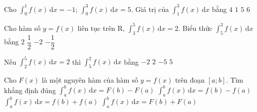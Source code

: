 \begin{ex}%
	Cho $\displaystyle\int_0^1f(x)\mathrm{\,d}x=-1$; $\displaystyle\int_0^3f(x)\mathrm{\,d}x=5$. Giá trị của $\displaystyle\int_1^3f(x)\mathrm{\,d}x$ bằng 
	\choice 
		{$4$} 
		{$1$} 
		 {$5$}
		{\True $6$} 
\end{ex}

\begin{ex}%
	Cho hàm số $y=f(x)$ liên tục trên $\mathrm{R}$, $\displaystyle\int_3^5 f(x)\mathrm{\,d}x =2$. Biểu thức  $\displaystyle\int_5^3 f(x)\mathrm{\,d}x$ bằng
	\choice 
		{$2$} 
		 {$\dfrac{1}{2}$}
		 {\True $-2$}
		{$-\dfrac{1}{2}$} 
\end{ex}

\begin{ex}%
	 Nếu $\displaystyle\int_2^5f(x)\mathrm{\,d}x=2$ thì $\displaystyle\int_5^2f(x)\mathrm{\,d}x$ bằng
	 \choice
		{\True  $-2$}
		{$2$} 
		{$-5$} 
		{$5$} 
\end{ex}

\begin{ex}%
	Cho $F(x)$ là một nguyên hàm của hàm số $y=f(x)$ trên  đoạn $[a; b]$. Tìm khẳng định đúng
	 \choice
		{\True $\displaystyle\int_a^b f(x)\mathrm{\,d}x=F(b)-F(a)$} 
		 {$\displaystyle\int_a^b f(x)\mathrm{\,d}x=f(b)-f(a)$}
		 {$\displaystyle\int_a^b f(x)\mathrm{\,d}x=f(b)+f(a)$}
		 {$\displaystyle\int_a^b f(x)\mathrm{\,d}x=F(b)+F(a)$}
\end{ex}

